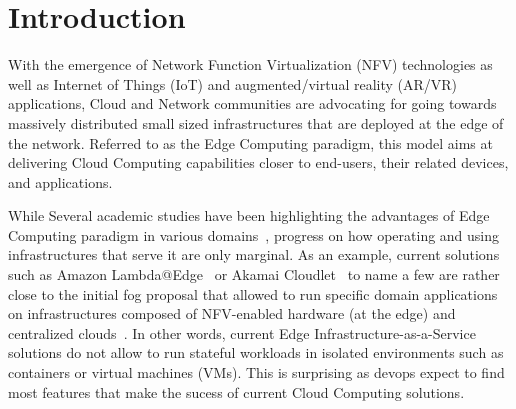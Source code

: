\section{Introduction}
\label{sec:intro}


With the emergence of Network Function Virtualization (NFV)
technologies as well as Internet of Things (IoT) and augmented/virtual
reality (AR/VR) applications, Cloud and Network communities are
advocating for going towards massively distributed small sized
infrastructures that are deployed at the edge of the network.
%
Referred to as the Edge Computing paradigm, this model aims at
delivering Cloud Computing capabilities closer to end-users, their
related devices, and applications.
%

While Several academic studies have been highlighting the advantages
of Edge Computing paradigm in various
domains~\cite{bonomi2012fog,zhang2015cloud,yi2015fog,shi2016edge,satyanarayanan2017emergence},
progress on how operating and using infrastructures that serve it are
only marginal.  As an example, current solutions such as Amazon
Lambda@Edge~\cite{amazon:lambda-edge} or Akamai
Cloudlet~\cite{akamai:cloudlets} to name a few are rather close to the
initial fog proposal that allowed to run specific domain applications
on infrastructures composed of NFV-enabled hardware (at the edge) and
centralized clouds~\cite{bonomi2012fog}.  In other words, current Edge
Infrastructure-as-a-Service solutions do not allow to run stateful
workloads in isolated environments such as containers or virtual
machines (VMs).
%
This is surprising as devops expect to find most features that make the sucess of
current Cloud Computing solutions.




